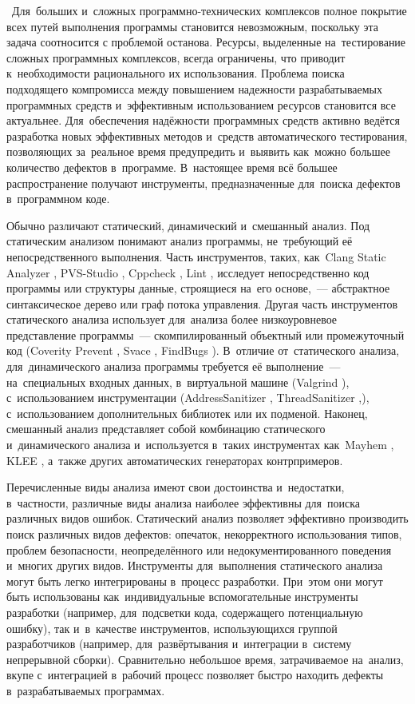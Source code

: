 \actuality\
Для~больших и~сложных программно-технических комплексов полное покрытие всех путей выполнения программы становится невозможным, поскольку эта задача соотносится с проблемой останова. Ресурсы, выделенные на~тестирование сложных программных комплексов, всегда ограничены, что приводит к~необходимости рационального  их использования. Проблема поиска подходящего компромисса  между повышением надежности разрабатываемых программных средств и~эффективным использованием ресурсов становится все актуальнее. Для~обеспечения надёжности программных средств  активно ведётся разработка новых эффективных методов и~средств автоматического тестирования, позволяющих за~реальное время предупредить и~выявить как~можно большее количество дефектов в~программе. В~настоящее время всё большее распространение получают инструменты, предназначенные для~поиска дефектов в~программном коде.

Обычно различают статический, динамический и~смешанный анализ. Под статическим анализом понимают анализ программы, не~требующий её непосредственного выполнения. Часть инструментов, таких, как~Clang Static Analyzer \cite{csa}, PVS-Studio \cite{pvs}, Cppcheck \cite{cppcheck}, Lint \cite{lint}, исследует непосредственно код программы или структуры данные, строящиеся на~его основе,~--- абстрактное синтаксическое дерево или граф потока управления. Другая часть инструментов статического анализа использует для~анализа более низкоуровневое представление программы~--- скомпилированный объектный или промежуточный код (Coverity Prevent \cite{coverity}, Svace \cite{svace}, FindBugs \cite{findbugs}). В~отличие от~статического анализа, для~динамического анализа программы требуется её выполнение~--- на~специальных входных данных, в~виртуальной машине (Valgrind \cite{valgrind}), с~использованием инструментации (AddressSanitizer \cite{asan}, ThreadSanitizer \cite{tsan},), с~использованием дополнительных библиотек или их подменой. Наконец, смешанный анализ представляет собой комбинацию статического и~динамического анализа и~используется в~таких инструментах как~Mayhem \cite{mayhem}, KLEE \cite{klee}, а~также других автоматических генераторах контрпримеров.

Перечисленные виды анализа имеют свои достоинства и~недостатки, в~частности, различные виды анализа наиболее эффективны для~поиска различных видов ошибок. Статический анализ позволяет эффективно производить поиск различных видов дефектов: опечаток, некорректного использования типов, проблем безопасности, неопределённого или недокументированного поведения и~многих других видов. Инструменты для~выполнения статического анализа могут быть легко интегрированы в~процесс разработки. При~этом они могут быть использованы как~индивидуальные вспомогательные инструменты разработки (например, для~подсветки кода, содержащего потенциальную ошибку), так и~в~качестве инструментов, использующихся группой разработчиков (например, для~развёртывания и~интеграции в~систему непрерывной сборки). Сравнительно небольшое время, затрачиваемое на~анализ, вкупе с~интеграцией в~рабочий процесс позволяет быстро находить дефекты в~разрабатываемых программах.

